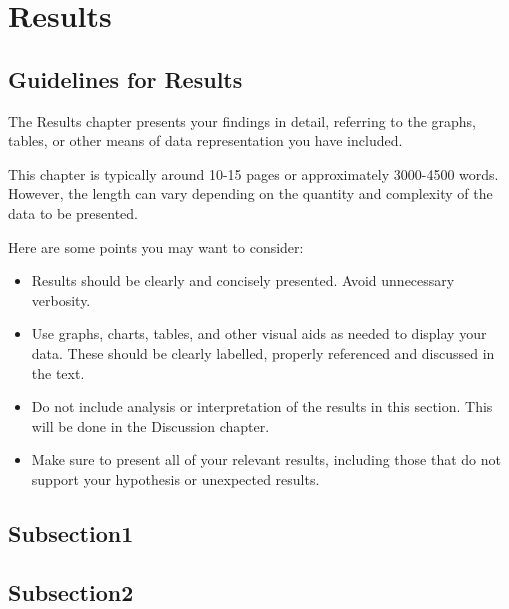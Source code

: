 \chapter{Results}

\section*{Guidelines for Results}
The Results chapter presents your findings in detail, referring to the graphs, tables, or other means of data representation you have included. 

This chapter is typically around 10-15 pages or approximately 3000-4500 words. However, the length can vary depending on the quantity and complexity of the data to be presented.

Here are some points you may want to consider:
\begin{itemize}
    \item Results should be clearly and concisely presented. Avoid unnecessary verbosity.
    \item Use graphs, charts, tables, and other visual aids as needed to display your data. These should be clearly labelled, properly referenced and discussed in the text.
    \item Do not include analysis or interpretation of the results in this section. This will be done in the Discussion chapter.
    \item Make sure to present all of your relevant results, including those that do not support your hypothesis or unexpected results. 
\end{itemize}


\section{Subsection1}

\section{Subsection2}
